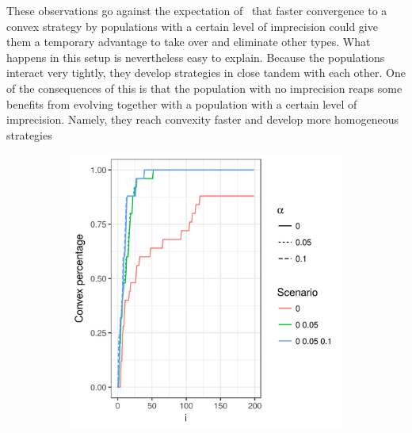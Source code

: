 \documentclass[a4paper]{article}
\begin{document}
These observations go against the expectation of~\textcite{franke_vagueness_2017} that faster convergence to a convex strategy by populations with a certain level of imprecision could give them a temporary advantage to take over and eliminate other types.
What happens in this setup is nevertheless easy to explain.
Because the populations interact very tightly, they develop strategies in close tandem with each other.
One of the consequences of this is that the population with no imprecision reaps some benefits from evolving together with a population with a certain level of imprecision.
Namely, they reach convexity faster and develop more homogeneous strategies
\begin{figure}
  \centering
  \begin{subfigure}[]{0.3\textwidth}
    \includegraphics[width=\textwidth]{simulation/results/round-3/plots/convex-percentage-all-strong.png}
    \label{fig:convexity-tight-interaction}
  \end{subfigure}
  \hfill
  \begin{subfigure}[]{0.3\textwidth}

\end{subfigure}
\end{figure}
\end{document}
